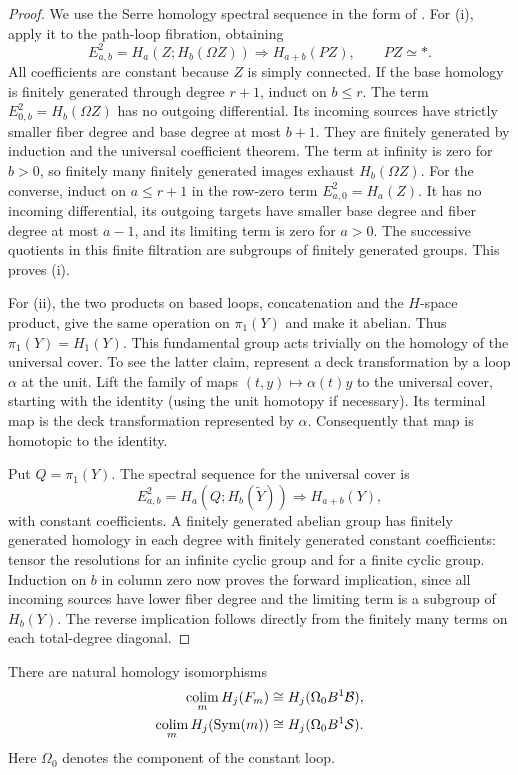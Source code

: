 \begin{proof}
We use the Serre homology spectral sequence in the form of
\cite[Theorem~1.3, p.~8]{HatcherSpectralSequences}.
For (i), apply it to the path-loop fibration, obtaining
\[
 E^2_{a,b}=H_a(Z;H_b(\Omega Z))\Longrightarrow H_{a+b}(PZ),
 \qquad PZ\simeq *.
\]
All coefficients are constant because $Z$ is simply connected.
If the base homology is finitely generated through degree $r+1$,
induct on $b\leq r$.  The term $E^2_{0,b}=H_b(\Omega Z)$ has no
outgoing differential.  Its incoming sources have strictly smaller
fiber degree and base degree at most $b+1$.  They are finitely
generated by induction and the universal coefficient theorem.  The
term at infinity is zero for $b>0$, so finitely many finitely
generated images exhaust $H_b(\Omega Z)$.  For the converse, induct
on $a\leq r+1$ in the row-zero term $E^2_{a,0}=H_a(Z)$.  It has no
incoming differential, its outgoing targets have smaller base
degree and fiber degree at most $a-1$, and its limiting term is
zero for $a>0$.  The successive quotients in this finite filtration
are subgroups of finitely generated groups.  This proves (i).

For (ii), the two products on based loops, concatenation and the
$H$-space product, give the same operation on $\pi_1(Y)$ and make
it abelian.  Thus $\pi_1(Y)=H_1(Y)$.  This fundamental group acts
trivially on the homology of the universal cover.  To see the latter
claim, represent a deck transformation by a loop $\alpha$ at the
unit.  Lift the family of maps
$(t,y)\mapsto\alpha(t)y$ to the universal cover, starting with the
identity (using the unit homotopy if necessary).  Its terminal map
is the deck transformation represented by $\alpha$.  Consequently
that map is homotopic to the identity.

Put $Q=\pi_1(Y)$.  The spectral sequence for the universal cover is
\[
 E^2_{a,b}=H_a(Q;H_b(\widetilde Y))\Longrightarrow H_{a+b}(Y),
\]
with constant coefficients.  A finitely generated abelian group
has finitely generated homology in each degree with finitely
generated constant coefficients: tensor the resolutions for an
infinite cyclic group and for a finite cyclic group.  Induction on
$b$ in column zero now proves the forward implication, since all
incoming sources have lower fiber degree and the limiting term is
a subgroup of $H_b(Y)$.  The reverse implication follows directly
from the finitely many terms on each total-degree diagonal.
\end{proof}

\begin{lemma}\label{lem:hom-cofinal-completion}
There are natural homology isomorphisms
\begin{align*}
 \underset{m}{\operatorname{colim}}\,H_j(F_m)
   &\cong H_j(\Omega_0 B^1\mathcal B),\\
 \underset{m}{\operatorname{colim}}\,H_j(\operatorname{Sym}(m))
   &\cong H_j(\Omega_0 B^1\mathcal S).
\end{align*}
Here $\Omega_0$ denotes the component of the constant loop.
\end{lemma}

